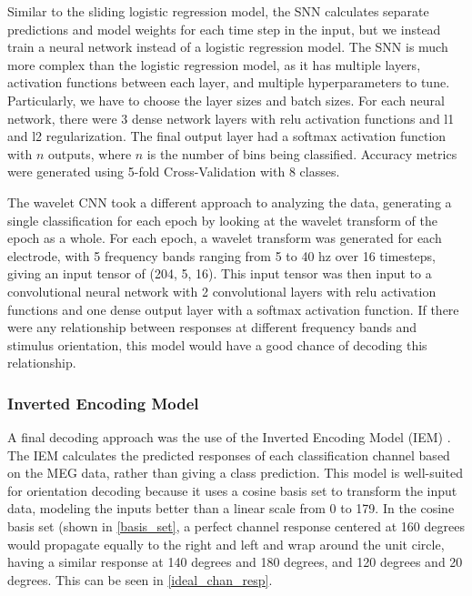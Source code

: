 \documentclass[../main.tex]{subfiles}
\begin{document}
Similar to the sliding logistic regression model, the SNN calculates separate predictions and model weights for each time step in the input, but we instead train a neural network instead of a logistic regression model. The SNN is much more complex than the logistic regression model, as it has multiple layers, activation functions between each layer, and multiple hyperparameters to tune. Particularly, we have to choose the layer sizes and batch sizes. For each neural network, there were 3 dense network layers with relu activation functions and l1 and l2 regularization. The final output layer had a softmax activation function with $n$ outputs, where $n$ is the number of bins being classified. Accuracy metrics were generated using 5-fold Cross-Validation with 8 classes.

The wavelet CNN took a different approach to analyzing the data, generating a single classification for each epoch by looking at the wavelet transform of the epoch as a whole. For each epoch, a wavelet transform was generated for each electrode, with 5 frequency bands ranging from 5 to 40 hz over 16 timesteps, giving an input tensor of (204, 5, 16). This input tensor was then input to a convolutional neural network with 2 convolutional layers with relu activation functions and one dense output layer with a softmax activation function. If there were any relationship between responses at different frequency bands and stimulus orientation, this model would have a good chance of decoding this relationship.


\subsubsection{Inverted Encoding Model}
A final decoding approach was the use of the Inverted Encoding Model (IEM) \citep{Brouwer09, Brouwer, GARCIA2013515,sprague_serences_2013, sprague_saproo_serences_2015}. The IEM calculates the predicted responses of each classification channel based on the MEG data, rather than giving a class prediction. This model is well-suited for orientation decoding because it uses a cosine basis set to transform the input data, modeling the inputs better than a linear scale from 0 to 179. In the cosine basis set (shown in \ref{basis_set}, a perfect channel response centered at 160 degrees would propagate equally to the right and left and wrap around the unit circle, having a similar response at 140 degrees and 180 degrees, and 120 degrees and 20 degrees. This can be seen in \ref{ideal_chan_resp}. 
\end{document}
